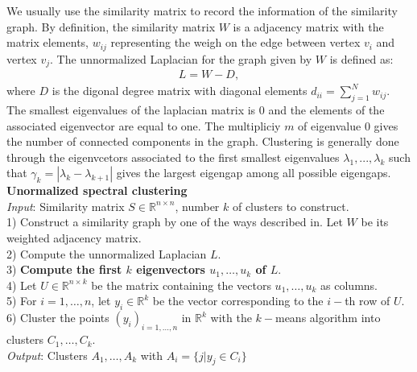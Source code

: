 \documentclass[twocolumn,notitlepage]{revtex4-1}
\begin{document}
We usually use the similarity matrix to record the information of the similarity graph. By definition, the similarity matrix $W$ is a adjacency matrix with the matrix elements, $w_{ij}$ representing the weigh on the edge between vertex $v_{i}$ and vertex $v_{j}$. The unnormalized Laplacian
for the graph given by $W$ is defined as:
\begin{align}
    L= W-D,
\end{align}
where $D$ is the digonal degree matrix with diagonal elements $d_{ii} = \sum_{j=1}^N w_{ij}$. The smallest eigenvalues of the laplacian matrix is 0 and the elements of the associated eigenvector are equal to one. The multipliciy $m$ of eigenvalue 0 gives the number of connected components in the graph. Clustering is generally done through the eigenvcetors associated to the first smallest eigenvalues $\lambda_1,...,\lambda_k$ such that $\gamma_{k}=|\lambda_{k}-\lambda_{k+1}|$ gives the largest eigengap among all possible eigengaps.\\
\textbf{Unormalized spectral clustering}\\
\emph{Input}: Similarity matrix $S \in \mathbb{R}^{n\times n}$, number $k$ of clusters to construct.\\
1) Construct a similarity graph by one of the ways described in. Let $W$ be its weighted adjacency matrix.\\
2) Compute the unnormalized Laplacian $L$.\\
3) \textbf{Compute the first $k$ eigenvectors $u_{1},\ldots,u_{k}$ of $L$}.\\
4) Let $U \in \mathbb{R}^{n \times k}$ be the matrix containing the vectors $u_{1},\ldots,u_{k}$ as columns.\\
5) For $i=1,\ldots,n$, let $y_{i} \in \mathbb{R}^{k}$ be the vector corresponding to the $i-$th row of $U$.\\
6) Cluster the points $(y_{i})_{i=1,\ldots,n}$ in $\mathbb{R}^{k}$ with the $k-$means algorithm into clusters $C_{1},\ldots,C_{k}$.\\
\emph{Output}: Clusters $A_{1},\ldots,A_{k}$ with $A_{i}=\{j|y_{j}\in C_{i}\}$
\end{document}
